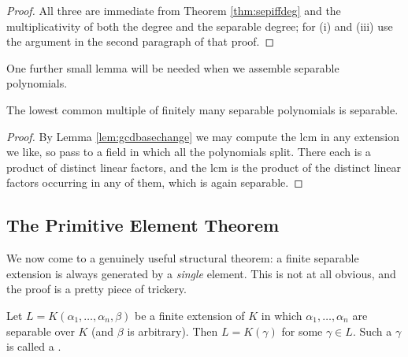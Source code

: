 \documentclass[a4paper]{scrartcl}
\begin{document}
\begin{proof}
	All three are immediate from Theorem \ref{thm:sepiffdeg} and the multiplicativity of both the degree and the separable degree; for (i) and (iii) use the argument in the second paragraph of that proof.
\end{proof}

One further small lemma will be needed when we assemble separable polynomials.

\begin{lemma}\label{lem:lcmsep}
	The lowest common multiple of finitely many separable polynomials is separable.
\end{lemma}

\begin{proof}
	By Lemma \ref{lem:gcdbasechange} we may compute the lcm in any extension we like, so pass to a field in which all the polynomials split. There each is a product of distinct linear factors, and the lcm is the product of the distinct linear factors occurring in any of them, which is again separable.
\end{proof}

\subsection{The Primitive Element Theorem}

We now come to a genuinely useful structural theorem: a finite separable extension is always generated by a \emph{single} element. This is not at all obvious, and the proof is a pretty piece of trickery.

\begin{theorem}\label{thm:pet}
	Let $L = K(\alpha_1, \dots, \alpha_n, \beta)$ be a finite extension of $K$ in which $\alpha_1, \dots, \alpha_n$ are separable over $K$ (and $\beta$ is arbitrary). Then $L = K(\gamma)$ for some $\gamma \in L$. Such a $\gamma$ is called a .
\end{theorem}
\end{document}
